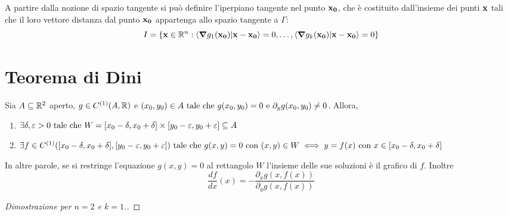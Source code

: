 \begin{definition}
    A partire dalla nozione di spazio tangente si può definire l'iperpiano tangente nel punto $\vb{x_0}$, che è costituito dall'insieme dei punti $\vb{x}$ tali che il loro vettore distanza dal punto $\vb{x_0}$ appartenga allo spazio tangente a $\Gamma$:
    \begin{equation*}
        I= \{ \vb{x} \in \R^n :  \innerproduct{\grad g_1(\vb{x_0)}}{\vb{x}-\vb{x_0}}=0,\dots,\innerproduct{\grad g_k(\vb{x_0)}}{\vb{x}-\vb{x_0}}=0 \}
    \end{equation*}
\end{definition}

\section{Teorema di Dini}

\begin{theorem}
    Sia $A \subseteq \mathbb{R}^2$ aperto, $g \in C^{(1)}(A, \mathbb{R})$ e $(x_0,y_0) \in A \text{ tale che } g(x_0, y_0)=0 \text{ e } \partial_y g(x_0,y_0)\neq 0$.
    Allora,
    \begin{enumerate}
        \item $\exists \delta, \varepsilon>0 \text{ tale che } W=[x_0-\delta,x_0+\delta]\times[y_0-\varepsilon,y_0+\varepsilon] \subseteq A$
        \item $\exists f \in C^{(1)}([x_0-\delta,x_0+\delta],[y_0-\varepsilon,y_0+\varepsilon]) \text{ tale che } g(x,y)=0 \text{ con } (x,y) \in W \iff y=f(x) \text{ con } x \in [x_0-\delta,x_0+\delta]$
    \end{enumerate}
    In altre parole, se si restringe l'equazione $g(x,y)=0$ al rettangolo $W$ l'insieme delle sue soluzioni è il grafico di $f$. Inoltre
    \begin{equation*}
        \frac{df}{dx}(x)=-\frac{\partial_x g(x,f(x))}{\partial_y g(x,f(x))}
    \end{equation*}
\end{theorem}

\begin{proof}
    [Dimostrazione per $n=2$ e $k=1$.]
\end{proof}

